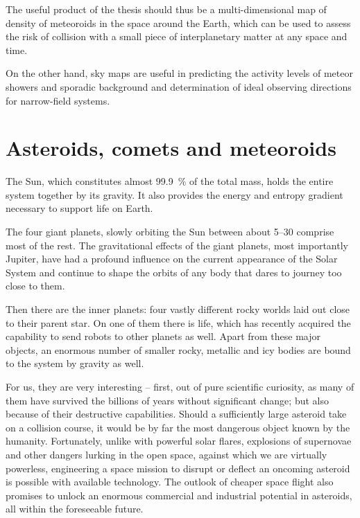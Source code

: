     The useful product of the thesis should thus be a multi-dimensional map of density
    of meteoroids in the space around the Earth, which can be used to assess the risk
    of collision with a small piece of interplanetary matter at any space and time.

    On the other hand, sky maps are useful in predicting the activity levels of
    meteor showers and sporadic background and determination of ideal observing
    directions for narrow-field systems.

\section{Asteroids, comets and meteoroids} \label{ia}

  

    The Sun, which constitutes almost \SI{99.9}{\percent} of the total mass, holds the entire
    system together by its gravity. It also provides the energy and entropy gradient necessary
    to support life on Earth.

    The four giant planets, slowly orbiting the Sun between about \SIrange[range-phrase = {\ and\ }]{5}{30}{\au}
    comprise most of the rest. The gravitational effects of the giant planets, most importantly Jupiter,
    have had a profound influence on the current appearance of the Solar System and continue to
    shape the orbits of any body that dares to journey too close to them.

    Then there are the inner planets: four vastly different rocky worlds laid out
    close to their parent star. On one of them there is life,
    which has recently acquired the capability to send robots to other planets as well.
    Apart from these major objects, an enormous number of smaller rocky, metallic and icy
    bodies are bound to the system by gravity as well.

    For us, they are very interesting -- first, out of pure scientific curiosity, as many of them
    have survived the billions of years without significant change; but also because of their destructive capabilities.
    Should a sufficiently large asteroid take on a collision course, it would be by far the most dangerous object
    known by the humanity. Fortunately, unlike with powerful solar flares, explosions of supernovae and other
    dangers lurking in the open space, against which we are virtually powerless,
    engineering a space mission to disrupt or deflect an oncoming asteroid is possible with available technology.
    The outlook of cheaper space flight also promises to unlock an enormous commercial and industrial potential in asteroids,
    all within the foreseeable future.


